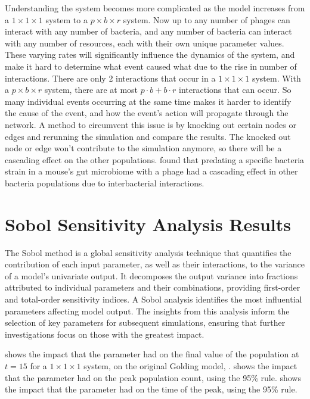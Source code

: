 Understanding the system becomes more complicated as the model increases from a $1\times1\times1$ system to a $p\times b\times r$ system. 
Now up to any number of phages can interact with any number of bacteria, and any number of bacteria can interact with any number of resources, each with their own unique parameter values. 
These varying rates will significantly influence the dynamics of the system, and make it hard to determine what event caused what due to the rise in number of interactions.
There are only 2 interactions that occur in a $1\times1\times1$ system. 
With a $p\times b\times r$ system, there are at most $p\cdot b + b\cdot r$ interactions that can occur. 
So many individual events occurring at the same time makes it harder to identify the cause of the event, and how the event's action will propagate through the network. 
A method to circumvent this issue is by knocking out certain nodes or edges and rerunning the simulation and compare the results. 
The knocked out node or edge won't contribute to the simulation anymore, so there will be a cascading effect on the other populations. 
\citet{hsuDynamicModulationGut2019} found that predating a specific bacteria strain in a mouse's gut microbiome with a phage had a cascading effect in other bacteria populations due to interbacterial interactions. 

\section{Sobol Sensitivity Analysis Results}
\label{sec:Sobol_sensitivity_analysis_results}
The Sobol method is a global sensitivity analysis technique that quantifies the contribution of each input parameter, as well as their interactions, to the variance of a model's univariate output. 
It decomposes the output variance into fractions attributed to individual parameters and their combinations, providing first-order and total-order sensitivity indices.
A Sobol analysis identifies the most influential parameters affecting model output. 
The insights from this analysis inform the selection of key parameters for subsequent simulations, ensuring that further investigations focus on those with the greatest impact.

 shows the impact that the parameter had on the final value of the population at $t=15$ for a $1\times 1\times 1$ system, on the original Golding model, . 
 shows the impact that the parameter had on the peak population count, using the 95\% rule. 
 shows the impact that the parameter had on the time of the peak, using the 95\% rule. 

